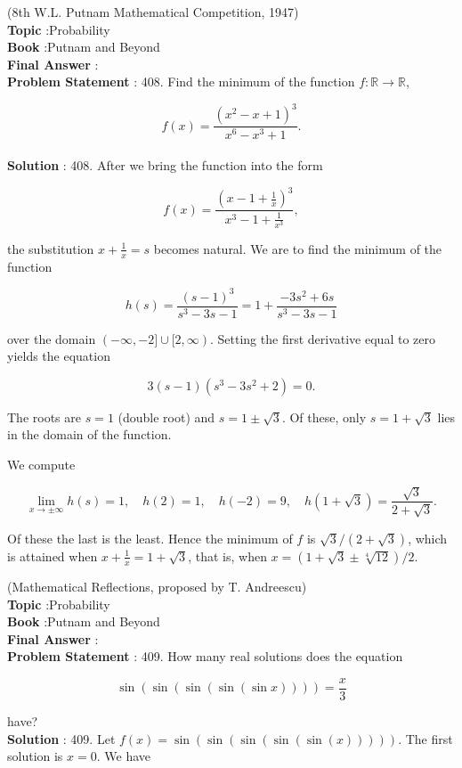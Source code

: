\documentclass[10pt]{article}
\begin{document}
(8th W.L. Putnam Mathematical Competition, 1947)
\\
\textbf{Topic} :Probability\\
\textbf{Book} :Putnam and Beyond\\
\textbf{Final Answer} :\\


\textbf{Problem Statement} :
408. Find the minimum of the function $f: \mathbb{R} \rightarrow \mathbb{R}$,

$$
f(x)=\frac{\left(x^{2}-x+1\right)^{3}}{x^{6}-x^{3}+1} .
$$
\\
\textbf{Solution} :
408. After we bring the function into the form

$$
f(x)=\frac{\left(x-1+\frac{1}{x}\right)^{3}}{x^{3}-1+\frac{1}{x^{3}}},
$$

the substitution $x+\frac{1}{x}=s$ becomes natural. We are to find the minimum of the function

$$
h(s)=\frac{(s-1)^{3}}{s^{3}-3 s-1}=1+\frac{-3 s^{2}+6 s}{s^{3}-3 s-1}
$$

over the domain $(-\infty,-2] \cup[2, \infty)$. Setting the first derivative equal to zero yields the equation

$$
3(s-1)\left(s^{3}-3 s^{2}+2\right)=0 .
$$

The roots are $s=1$ (double root) and $s=1 \pm \sqrt{3}$. Of these, only $s=1+\sqrt{3}$ lies in the domain of the function.

We compute

$$
\lim _{x \rightarrow \pm \infty} h(s)=1, \quad h(2)=1, \quad h(-2)=9, \quad h(1+\sqrt{3})=\frac{\sqrt{3}}{2+\sqrt{3}} .
$$

Of these the last is the least. Hence the minimum of $f$ is $\sqrt{3} /(2+\sqrt{3})$, which is attained when $x+\frac{1}{x}=1+\sqrt{3}$, that is, when $x=(1+\sqrt{3} \pm \sqrt[4]{12}) / 2$.

(Mathematical Reflections, proposed by T. Andreescu)
\\
\textbf{Topic} :Probability\\
\textbf{Book} :Putnam and Beyond\\
\textbf{Final Answer} :\\


\textbf{Problem Statement} :
409. How many real solutions does the equation

$$
\sin (\sin (\sin (\sin (\sin x))))=\frac{x}{3}
$$

have?
\\
\textbf{Solution} :
409. Let $f(x)=\sin (\sin (\sin (\sin (\sin (x)))))$. The first solution is $x=0$. We have
\end{document}
